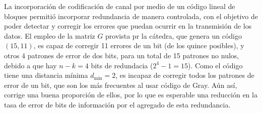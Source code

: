 La incorporación de codificación de canal por medio de un código
lineal de bloques permitió incorporar redundancia de manera controlada,
con el objetivo de poder detectar y corregir los errores que puedan
ocurrir en la transmisión de los datos. El empleo de la matriz $G$
provista pr la cátedra, que genera un código $(15, 11)$, es capaz de
corregir 11 errores de un bit (de los quince posibles), y otros 4
patrones de error de dos bits, para un total de 15 patrones no nulos,
debido a que hay $n-k=4$ bits de redundacia ($2^4 - 1 = 15$). Como el
código tiene una distancia mínima $d_{\min} = 2$, es incapaz de
corregir todos los patrones de error de un bit, que son los más
frecuentes al usar código de Gray. Aún así, corrige una buena proporción
de ellos, por lo que es esperable una reducción en la tasa de error de
bits de información por el agregado de esta redundancia.


